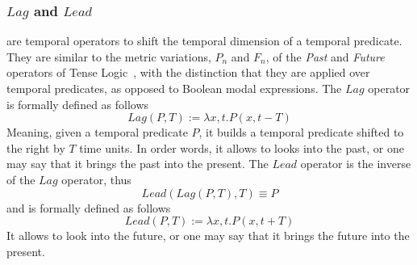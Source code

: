 \documentclass[runningheads]{llncs}
\newcommand{\TLamb}{\textit{Lambda}}
\newcommand{\TLag}{\textit{Lag}}
\newcommand{\TLead}{\textit{Lead}}
\begin{document}
\subsubsection{$\TLag$ and $\TLead$} are temporal operators to shift
the temporal dimension of a temporal predicate.  They are similar to
the metric variations, $P_n$ and $F_n$, of the \emph{Past} and
\emph{Future} operators of Tense Logic~\cite{Prior1967}, with the
distinction that they are applied over temporal predicates, as opposed
to Boolean modal expressions.  The $\TLag$ operator is formally
defined as follows
$$Lag(P, T) := \lambda x, t. P(x, t-T)$$
Meaning, given a temporal predicate $P$, it builds a temporal
predicate shifted to the right by $T$ time units.  In order words, it
allows to looks into the past, or one may say that it brings the past
into the present.
The $\TLead$ operator is the inverse of the $\TLag$ operator, thus
$$Lead(Lag(P, T), T) \equiv P$$
and is formally defined as follows
$$Lead(P, T) := \lambda x, t. P(x, t+T)$$
It allows to look into the future, or one may say that it brings the
future into the present.
\end{document}
